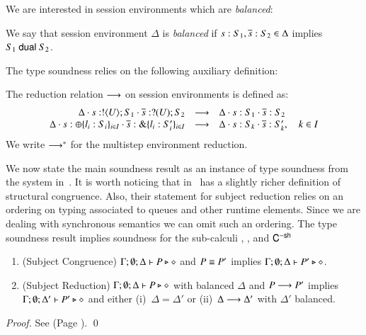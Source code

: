 We are interested in session environments 
which are \emph{balanced}:
%
\begin{definition}\label{d:wtenv}\myrm
	We say that session environment $\Delta$ is {\em balanced} if
	$s: S_1, \overline{s}: S_2 \in \Delta$ implies $S_1 \ \mathsf{dual}\  S_2$.
\end{definition}
%
The type soundness relies on the following auxiliary definition:
%
\begin{definition}\myrm
	\label{def:ses_red}
	The reduction relation $\longrightarrow$ on session environments is defined as:
%
\[
	\begin{array}{rcl}
		\Delta \cdot s: ! \langle U \rangle ; S_1 \cdot \overline{s}: ? (U) ; S_2 &\longrightarrow& \Delta \cdot s: S_1 \cdot \overline{s}: S_2
		\\
		\Delta \cdot s: \oplus \{l_i: S_i\}_{i \in I} \cdot \overline{s}: \& \{l_i: S_i'\}_{i \in I} &\longrightarrow& \Delta \cdot s: S_k \cdot \overline{s}: S_k', \quad k \in I
	\end{array}
\]
%
	We write $\longrightarrow^\ast$ for the multistep environment reduction.
\end{definition}
%
We now state the main soundness result as an instance
of type soundness from the system in~\cite{tlca07}.
It is worth noticing that in~\cite{tlca07} has a slightly richer
definition of structural congruence.
Also, their statement for subject reduction relies on an
ordering on typing associated to queues and other 
runtime elements. %
Since we are dealing with synchronous semantics we can omit such an ordering.
The type soundness result implies soundness for the sub-calculi
\HO, \sessp, and $\mathsf{C}^{\mathsf{-sh}}$

\begin{theorem}\myrm
	\label{thm:sr}
%
	\begin{enumerate}[1.]
		\item	(Subject Congruence)
			$\Gamma; \emptyset; \Delta \vdash P \triangleright \diamond$
			and
			$P \equiv P'$
			implies
			$\Gamma; \emptyset; \Delta \vdash P' \triangleright \diamond$.

		\item	(Subject Reduction)
			$\Gamma; \emptyset; \Delta \vdash P \triangleright \diamond$
			with
			balanced $\Delta$
			and
			$P \longrightarrow P'$
			implies $\Gamma; \emptyset; \Delta'  \vdash P' \triangleright \diamond$
			and either (i)~$\Delta = \Delta'$ or (ii)~$\Delta \longrightarrow \Delta'$
			with $\Delta'$ balanced.
	\end{enumerate}
\end{theorem}

\begin{proof}
	See  (Page \pageref{app:ts}).
	\qed
\end{proof}
